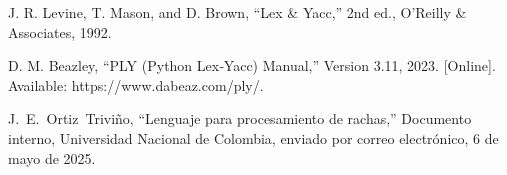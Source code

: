 \documentclass{article}
\begin{document}
\begin{thebibliography}{9}


 \label{ref:lexPy1} J. R. Levine, T. Mason, and D. 
Brown, “Lex \& Yacc,” 2nd ed., O’Reilly \& Associates, 1992.

 \label{ref:lexPy2}  D. M. Beazley, “PLY (Python Lex‐Yacc)
Manual,” Version 3.11, 2023. [Online]. Available: https://www.dabeaz.com/ply/.

 \label{ref:rachas} J.~E.~Ortiz~Triviño, ``Lenguaje para 
  procesamiento de rachas,'' Documento interno, Universidad Nacional de 
    Colombia, enviado por correo electrónico, 6 de mayo de 2025.

\end{thebibliography}
\end{document}
